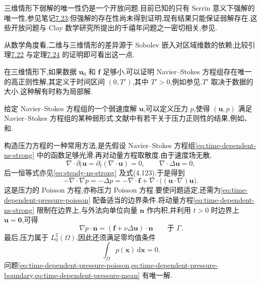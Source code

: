 \begin{note}[三维情形弱解的唯一性]
\label{note:time-dependent-three-dimensional-uniqueness}
三维情形下弱解的唯一性仍是一个开放问题.目前已知的只有 Serrin 意义下强解的唯一性,参见笔记\hyperref[note:time-dependent-serrin-uniqueness]{7.23};但强解的存在性尚未得到证明,现有结果只能保证弱解存在.这些开放问题与 Clay 数学研究所提出的千禧年问题之一密切相关,参见\textcite{Fefferman2000}.

从数学角度看,二维与三维情形的差异源于 Sobolev 嵌入对区域维数的依赖;比较引理\hyperref[lem:time-dependent-weak-solution-uniqueness]{7.22} 与定理\hyperref[thm:time-dependent-two-dimensional-uniqueness]{7.24} 的证明即可看出这一点.
\end{note}

\begin{note}[小数据的局部存在唯一性]
\label{note:time-dependent-local-existence-small-data}
在三维情形下,如果数据 $\bm{u}_0$ 和 $\bm{f}$ 足够小,可以证明 Navier--Stokes 方程组存在唯一的高正则性解,其定义于时间区间 $(0,T')$,其中 $T'>0$,例如参见\textcite[第 V 章定理 4.2.2]{Sohr2001}.$T'$ 取决于数据的大小.这种解有时称为局部解.
\end{note}

\begin{note}[压力]
\label{note:time-dependent-pressure}
给定 Navier--Stokes 方程组的一个弱速度解 $\bm{u}$,可以定义压力 $p$,使得 $(\bm{u},p)$ 满足 Navier--Stokes 方程组的某种弱形式.文献中有若干关于压力正则性的结果,例如\textcite[第 2 节]{Galdi2000}、\textcite[第 V.1.7 节]{Sohr2001} 和\textcite[第 307 页]{Temam1984}.
\end{note}

\begin{note}[$t>0$ 时的压力方程]
\label{note:time-dependent-pressure-equation}
构造压力方程的一种常用方法,是先假设 Navier--Stokes 方程组\cref{eq:time-dependent-ns-strong} 中的函数足够光滑,再对动量方程取散度.由于速度场无散,
\[
  \nabla\cdot\partial_t\bm{u}
    =\partial_t(\nabla\cdot\bm{u})=0,
  \qquad
  \nabla\cdot\Delta\bm{u}=0,
\]
后一恒等式亦见\cref{eq:steady-ns-strong} 及式(4.123).于是得到
\begin{equation}\label{eq:time-dependent-pressure-poisson}
  -\nabla\cdot\nabla p=-\Delta p
    =-\nabla\cdot\bm{f}
      +\nabla\cdot\bigl((\bm{u}\cdot\nabla)\bm{u}\bigr).
\end{equation}
这是压力的 Poisson 方程,亦称压力 Poisson 方程.要使问题适定,还需为\cref{eq:time-dependent-pressure-poisson} 配备适当的边界条件.将动量方程\cref{eq:time-dependent-ns-strong} 限制在边界上,与外法向单位向量 $\bm{n}$ 作内积,并利用 $t>0$ 时边界上 $\bm{u}=\bm{0}$,可得
\begin{equation}\label{eq:time-dependent-pressure-boundary}
  \nabla p\cdot\bm{n}
    =(\bm{f}+\nu\Delta\bm{u})\cdot\bm{n}
    \qquad\text{于 }\Gamma.
\end{equation}
最后,压力属于 $L_0^2(\Omega)$,因此还须满足零均值条件
\begin{equation}\label{eq:time-dependent-pressure-mean}
  \int_\Omega p(\bm{x})\,\mathrm{d}\bm{x}=0.
\end{equation}
问题\cref{eq:time-dependent-pressure-poisson,eq:time-dependent-pressure-boundary,eq:time-dependent-pressure-mean} 有唯一解.
\end{note}

